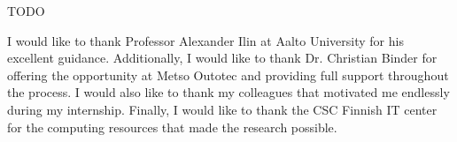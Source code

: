 \documentclass[english, 12pt, a4paper, elec, utf8, a-1b, online]{aaltothesis}
\date{29.7.2022}
\begin{document}
\makecoverpage

\makecopyrightpage


  
  

\begin{abstractpage}[english]
TODO
\end{abstractpage}


I would like to thank Professor Alexander Ilin at Aalto University for his excellent guidance. Additionally, I would like to thank Dr. Christian Binder for offering the opportunity at Metso Outotec and providing full support throughout the process. I would also like to thank my colleagues that motivated me endlessly during my internship. Finally, I would like to thank the CSC Finnish IT center for the computing resources that made the research possible. \\
\end{document}
